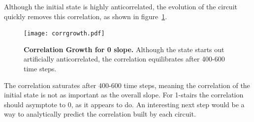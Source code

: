 \documentclass[11pt]{article}
\begin{document}
Although the initial state is highly anticorrelated, the evolution of the circuit quickly removes this correlation, as shown in figure~\ref{fig:corrgrowth}.
\begin{figure}
	\centering
	\texttt{[image: corrgrowth.pdf]}
	\caption{\textbf{Correlation Growth for 0 slope.} Although the state starts out artificially anticorrelated, the correlation equilibrates after 400-600 time steps.}
	\label{fig:corrgrowth}
\end{figure}
The correlation saturates after 400-600 time steps, meaning the correlation of the initial state is not as important as the overall slope. For 1-stairs the correlation should asymptote to 0, as it appears to do. An interesting next step would be a way to analytically predict the correlation built by each circuit.







\printbibliography
\end{document}
